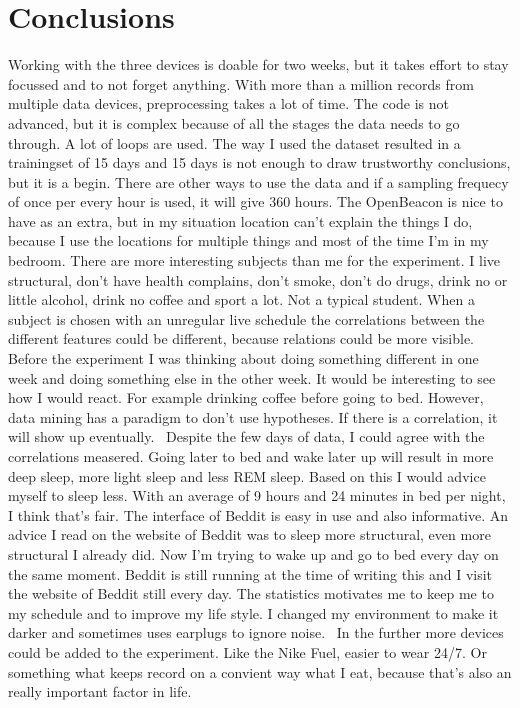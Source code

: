 \section{Conclusions}
	Working with the three devices is doable for two weeks, but it takes effort to stay focussed and to not forget anything. With more than a million records from multiple data devices, preprocessing takes a lot of time. The code is not advanced, but it is complex because of all the stages the data needs to go through. A lot of loops are used. The way I used the dataset resulted in a trainingset of 15 days and 15 days is not enough to draw trustworthy conclusions, but it is a begin. There are other ways to use the data and if a sampling frequecy of once per every hour is used, it will give 360 hours. The OpenBeacon is nice to have as an extra, but in my situation location can't explain the things I do, because I use the locations for multiple things and most of the time I'm in my bedroom. 
	There are more interesting subjects than me for the experiment. I live structural, don't have health complains, don't smoke, don't do drugs, drink no or little alcohol, drink no coffee and sport a lot. Not a typical student. When a subject is chosen with an unregular live schedule the correlations between the different features could be different, because relations could be more visible. Before the experiment I was thinking about doing something different in one week and doing something else in the other week. It would be interesting to see how I would react. For example drinking coffee before going to bed. However, data mining has a paradigm to don't use hypotheses. If there is a correlation, it will show up eventually.
	\
	Despite the few days of data, I could agree with the correlations measered. Going later to bed and wake later up will result in more deep sleep, more light sleep and less REM sleep. Based on this I would advice myself to sleep less. With an average of 9 hours and 24 minutes in bed per night, I think that's fair. The interface of Beddit is easy in use and also informative. An advice I read on the website of Beddit was to sleep more structural, even more structural I already did. Now I'm trying to wake up and go to bed every day on the same moment. Beddit is still running at the time of writing this and I visit the website of Beddit still every day. The statistics motivates me to keep me to my schedule and to improve my life style. I changed my environment to make it darker and sometimes uses earplugs to ignore noise. 
	\
	In the further more devices could be added to the experiment. Like the Nike Fuel, easier to wear 24/7. Or something what keeps record on a convient way what I eat, because that's also an really important factor in life. 
	

